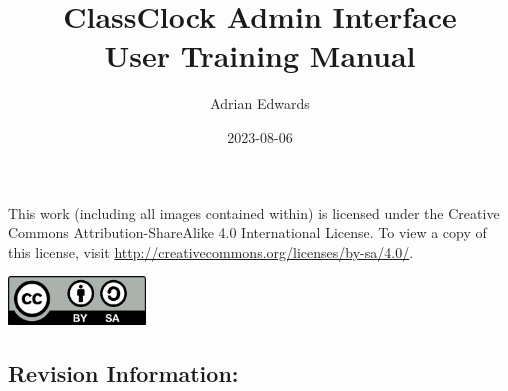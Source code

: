 \documentclass{article}
\title{ClassClock Admin Interface \\User Training Manual}
\author{Adrian Edwards}
\date{2023-08-06}
\begin{document}
\makeatletter
\begin{titlepage}
    
	\begin{FlushRight}
		\vspace*{1cm}
			
		\Huge
		\textbf{\@title}
			
		\vspace{0.5cm}
		\LARGE
		\@date
			
		\vspace{1.5cm}
			
		\textbf{\@author}
	\end{FlushRight}
		
	\vfill
	\begin{center}
        
		{This work (including all images contained within) is licensed under the Creative Commons Attribution-ShareAlike 4.0
		International License. To view a copy of this license, visit \href{http://creativecommons.org/licenses/by-sa/4.0/}{http://creativecommons.org/licenses/by-sa/4.0/}.}



		\includegraphics[width=1.439in,height=0.5043in]{images/CCBYSA.png}
            
    \end{center}
\end{titlepage}
\makeatother

\clearpage
\large
\subsection*{Revision Information:}
\end{document}

